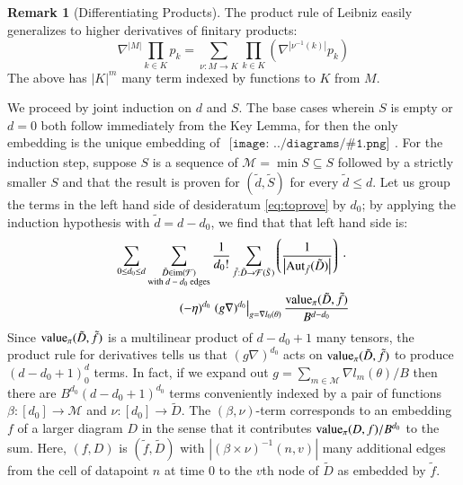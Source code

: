 \documentclass{article}
\theoremstyle{plain}
\theoremstyle{definition}
\newtheorem{rmk}{Remark}
\newcommand{\Free}{\mathcal{F}}
\newcommand{\Aut}{\text{\textnormal{Aut}}}
\newcommand{\image}{\text{\textnormal{im}}}
\newcommand{\dvalue}{\text{\textnormal{value}}}
\newcommand{\Mm}{\mathcal{M}}
\newcommand{\wrap}[1]{\left(#1\right)}
\newcommand{\wabs}[1]{\left|#1\right|}
\newcommand{\sdia}[1]{\begin{gathered}\texttt{[image: ../diagrams/\#1.png]}\end{gathered}}
\begin{document}
            \begin{rmk}[Differentiating Products]
                The product rule of Leibniz easily generalizes to higher
                derivatives of finitary products:
                $$
                    \nabla^{\wabs{M}} \prod_{k \in K} p_k
                    = 
                    \sum_{\nu:M\to K} \prod_{k\in K} \wrap{
                        \nabla^{\wabs{\nu^{-1}(k)}} p_k
                    }
                $$
                The above has $\wabs{K}^m$ many term indexed by functions to
                $K$ from $M$.
            \end{rmk}

            We proceed by joint induction on $d$ and $S$.  The base cases
            wherein $S$ is empty or $d=0$ both follow immediately from the Key
            Lemma, for then the only embedding is the unique embedding of
            $\sdia{(0)()}$.  For the induction step, suppose $S$ is a sequence
            of $\Mm = \min S \subseteq S$ followed by a strictly smaller $S$
            and that the result is proven for $(\tilde d, \tilde S)$ for every
            $\tilde d \leq d$.  Let us group the terms in the left hand side of
            desideratum \ref{eq:toprove} by $d_0$; by applying the induction
            hypothesis with $\tilde d = d - d_0$, we find that that left hand
            side is:
            \begin{align*}
                \sum_{\substack{
                    0 \leq d_0 \leq d
                }}
                \sum_{\substack{
                    \tilde D \in \image(\Free) \\
                    \textnormal{with $d-d_0$ edges}
                }}
                \frac{1}{d_0!}
                \sum_{\tilde f: \tilde D\to\Free(\tilde S)} \wrap{
                    \frac{1}{\wabs{\Aut_{\tilde f}(\tilde D)}}
                }
                ~\cdot~
                \\ %
                (-\eta)^{d_0}
                \left.
                    (g \nabla)^{d_0}
                \right|_{g=\nabla l_0(\theta)}
                \frac{\dvalue_\pi(\tilde D, \tilde f)}{B^{d-d_0}}
            \end{align*}
            Since $\dvalue_\pi(\tilde D, \tilde f)$ is a multilinear product of
            $d-d_0+1$ many tensors, the product rule for derivatives tells us
            that $(g \nabla)^{d_0}$ acts on $\dvalue_\pi(\tilde D, \tilde f)$
            to produce $(d-d_0+1)^d_0$ terms.  In fact, if we expand out
            $
                g = \sum_{m\in \Mm} \nabla l_m(\theta) / B
            $ 
            then there are $B^{d_0}(d-d_0+1)^{d_0}$ terms conveniently indexed
            by a pair of functions $\beta:[d_0]\to \Mm$ and $\nu:[d_0]\to
            \tilde D$.  The $(\beta, \nu)$-term corresponds to an embedding
            $f$ of a larger diagram $D$ in the sense that it contributes
            $\dvalue_\pi(D, f)/B^{d_0}$ to the sum.  Here, $(f, D)$ is $(\tilde
            f, \tilde D)$ with $\wabs{\wrap{\beta \times \nu}^{-1}(n, v)}$ many
            additional edges from the cell of datapoint $n$ at time $0$ to the
            $v$th node of $\tilde D$ as embedded by $\tilde f$.
\end{document}
